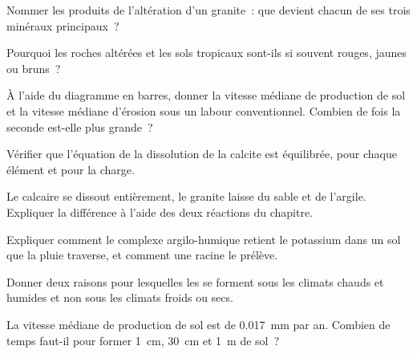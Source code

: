 \begin{exercise}[$\star$]\label{exo:g10:soil-formation:3}
Nommer les produits de l'altération d'un granite~: que devient chacun de ses
trois minéraux principaux~?
\end{exercise}

\begin{exercise}[$\star$]\label{exo:g10:soil-formation:4}
Pourquoi les roches altérées et les sols tropicaux sont-ils si souvent
rouges, jaunes ou bruns~?
\end{exercise}

\begin{exercise}[$\star$]\label{exo:g10:soil-formation:5}
À l'aide du diagramme en barres, donner la vitesse médiane de production de
sol et la vitesse médiane d'érosion sous un labour conventionnel. Combien de
fois la seconde est-elle plus grande~?
\end{exercise}

\begin{exercise}[$\star\star$]\label{exo:g10:soil-formation:6}
Vérifier que l'équation de la dissolution de la calcite est équilibrée,
pour chaque élément et pour la charge.
\end{exercise}

\begin{exercise}[$\star\star$]\label{exo:g10:soil-formation:7}
Le calcaire se dissout entièrement, le granite laisse du sable et de
l'argile. Expliquer la différence à l'aide des deux réactions du chapitre.
\end{exercise}

\begin{exercise}[$\star\star$]\label{exo:g10:soil-formation:8}
Expliquer comment le complexe argilo-humique retient le potassium dans un
sol que la pluie traverse, et comment une racine le prélève.
\end{exercise}

\begin{exercise}[$\star\star$]\label{exo:g10:soil-formation:9}
Donner deux raisons pour lesquelles les  se forment sous les
climats chauds et humides et non sous les climats froids ou secs.
\end{exercise}

\begin{exercise}[$\star\star$]\label{exo:g10:soil-formation:10}
La vitesse médiane de production de sol est de \qty{0.017}{mm} par an.
Combien de temps faut-il pour former \qty{1}{cm}, \qty{30}{cm} et \qty{1}{m}
de sol~?
\end{exercise}

